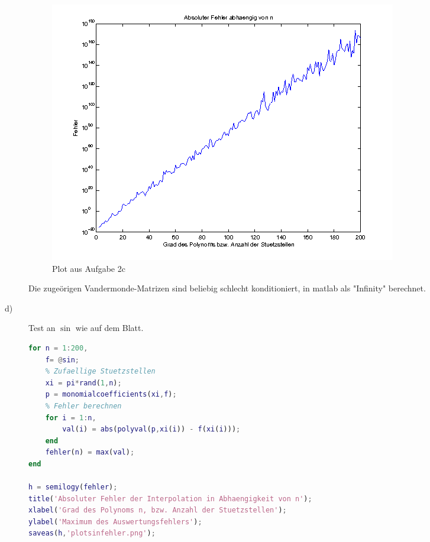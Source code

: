 \documentclass[11pt,a4paper,ngerman]{article}
\begin{document}
\begin{description}
\begin{figure}[h!]
\caption{Plot aus Aufgabe 2c}
\includegraphics[width=\textwidth]{test.png}
\end{figure}

Die zugeörigen Vandermonde-Matrizen sind beliebig schlecht konditioniert, in matlab als "Infinity" berechnet.

\newpage
\item[d)] Test an $\sin$ wie auf dem Blatt. \\

\begin{lstlisting}[language=matlab]
for n = 1:200,
    f= @sin;
    % Zufaellige Stuetzstellen
    xi = pi*rand(1,n);
    p = monomialcoefficients(xi,f);
    % Fehler berechnen
    for i = 1:n,
        val(i) = abs(polyval(p,xi(i)) - f(xi(i)));
    end
    fehler(n) = max(val);
end

h = semilogy(fehler);
title('Absoluter Fehler der Interpolation in Abhaengigkeit von n');
xlabel('Grad des Polynoms n, bzw. Anzahl der Stuetzstellen');
ylabel('Maximum des Auswertungsfehlers');
saveas(h,'plotsinfehler.png');
\end{lstlisting}



\end{description}
\end{document}
